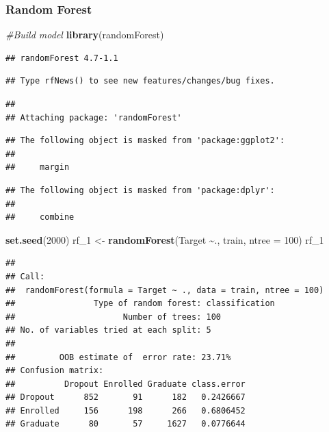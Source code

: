 \documentclass[
]{article}
\newenvironment{Shaded}{\begin{snugshade}}{\end{snugshade}}
\newcommand{\AttributeTok}[1]{\textcolor[rgb]{0.13,0.29,0.53}{#1}}
\newcommand{\CommentTok}[1]{\textcolor[rgb]{0.56,0.35,0.01}{\textit{#1}}}
\newcommand{\DecValTok}[1]{\textcolor[rgb]{0.00,0.00,0.81}{#1}}
\newcommand{\FunctionTok}[1]{\textcolor[rgb]{0.13,0.29,0.53}{\textbf{#1}}}
\newcommand{\NormalTok}[1]{#1}
\newcommand{\OtherTok}[1]{\textcolor[rgb]{0.56,0.35,0.01}{#1}}
\newcommand{\SpecialCharTok}[1]{\textcolor[rgb]{0.81,0.36,0.00}{\textbf{#1}}}
\begin{document}
\hypertarget{random-forest}{%
\subsubsection{Random Forest}\label{random-forest}}

\begin{Shaded}
\begin{Highlighting}[]
\CommentTok{\#Build model}
\FunctionTok{library}\NormalTok{(randomForest)}
\end{Highlighting}
\end{Shaded}

\begin{verbatim}
## randomForest 4.7-1.1
\end{verbatim}

\begin{verbatim}
## Type rfNews() to see new features/changes/bug fixes.
\end{verbatim}

\begin{verbatim}
## 
## Attaching package: 'randomForest'
\end{verbatim}

\begin{verbatim}
## The following object is masked from 'package:ggplot2':
## 
##     margin
\end{verbatim}

\begin{verbatim}
## The following object is masked from 'package:dplyr':
## 
##     combine
\end{verbatim}

\begin{Shaded}
\begin{Highlighting}[]
\FunctionTok{set.seed}\NormalTok{(}\DecValTok{2000}\NormalTok{)}
\NormalTok{rf\_1 }\OtherTok{\textless{}{-}} \FunctionTok{randomForest}\NormalTok{(Target }\SpecialCharTok{\textasciitilde{}}\NormalTok{., train, }\AttributeTok{ntree =} \DecValTok{100}\NormalTok{)}
\NormalTok{rf\_1}
\end{Highlighting}
\end{Shaded}

\begin{verbatim}
## 
## Call:
##  randomForest(formula = Target ~ ., data = train, ntree = 100) 
##                Type of random forest: classification
##                      Number of trees: 100
## No. of variables tried at each split: 5
## 
##         OOB estimate of  error rate: 23.71%
## Confusion matrix:
##          Dropout Enrolled Graduate class.error
## Dropout      852       91      182   0.2426667
## Enrolled     156      198      266   0.6806452
## Graduate      80       57     1627   0.0776644
\end{verbatim}
\end{document}
